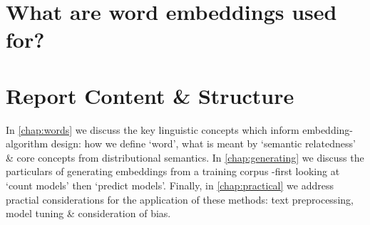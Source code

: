 \documentclass{ucetd}
\begin{document}
\section*{What are word embeddings used for?}


\section*{Report Content \& Structure}
In \autoref{chap:words} we discuss the key linguistic concepts which inform embedding-algorithm design: how we define `word', what is meant by `semantic relatedness' \& core concepts from distributional semantics. In \autoref{chap:generating} we discuss the particulars of generating embeddings from a training corpus -first looking at `count models' then `predict models'. Finally, in \autoref{chap:practical} we address practial considerations for the application of these methods: text preprocessing, model tuning \& consideration of bias.



\makebibliography
\end{document}
